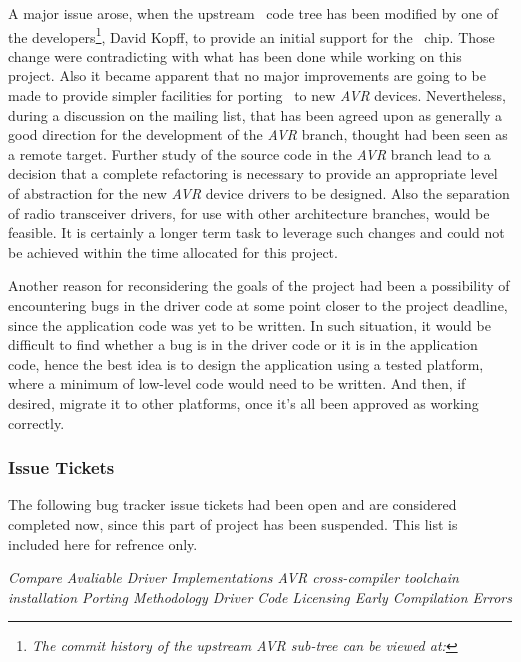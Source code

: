   A major issue arose, when the upstream \Contiki\ code tree has been
 modified by one of the developers\footnote{\emph{The commit history of
 the upstream AVR sub-tree can be viewed at:}
 },
 David Kopff, to provide an initial support for the \RFA\ chip. Those
 change were contradicting with what has been done while working on this
 project. Also it became apparent that no major improvements are going
 to be made to provide simpler facilities for porting \Contiki\ to new
 \emph{AVR} devices.
 Nevertheless, during a discussion on the mailing list, that has been
 agreed upon as generally a good direction for the development of the
 \emph{AVR} branch, thought had been seen as a remote target. Further
 study of the source code in the \emph{AVR} branch lead to a decision
 that a complete refactoring is necessary to provide an appropriate
 level of abstraction for the new \emph{AVR} device drivers to be
 designed. Also the separation of radio transceiver drivers, for use
 with other architecture branches, would be feasible. It is certainly
 a longer term task to leverage such changes and could not be achieved
 within the time allocated for this project.

  Another reason for reconsidering the goals of the project had been
 a possibility of encountering bugs in the driver code at some point
 closer to the project deadline, since the application code was yet to
 be written. In such situation, it would be difficult to find whether
 a bug is in the driver code or it is in the application code, hence
 the best idea is to design the application using a tested platform,
 where a minimum of low-level code would need to be written. And then,
 if desired, migrate it to other platforms, once it's all been approved
 as working correctly.

\subsubsection{Issue Tickets}

  The following bug tracker issue tickets had been open and are considered
 completed now, since this part of project has been suspended. This list
 is included here for refrence only.

 \begin{description} \em
	 Compare Avaliable Driver Implementations
	 AVR cross-compiler toolchain installation
	 Porting Methodology
	 Driver Code Licensing
	 Early Compilation Errors
 \end{description}
